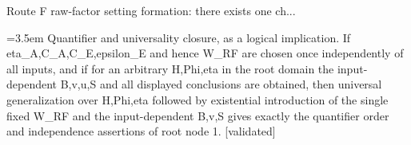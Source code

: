 \documentclass{article}
\newcommand{\step}[1]{\par\noindent\hangindent=3.5em\hangafter=1%
  \makebox[3.5em][l]{\textbf{#1.}}}
\newcommand{\steptag}[1]{\hfill{\small\textsf{[#1]}}}
\begin{document}
\begin{proofbox}{Route F raw-factor setting formation: there exists one ch...}
\step{1.9} Quantifier and universality closure, as a logical implication. If eta\_A,C\_A,C\_E,epsilon\_E and hence W\_RF are chosen once independently of all inputs, and if for an arbitrary H,Phi,eta in the root domain the input-dependent B,v,u,S and all displayed conclusions are obtained, then universal generalization over H,Phi,eta followed by existential introduction of the single fixed W\_RF and the input-dependent B,v,S gives exactly the quantifier order and independence assertions of root node 1. \steptag{validated} \\[4pt]
\end{proofbox}
\end{document}
